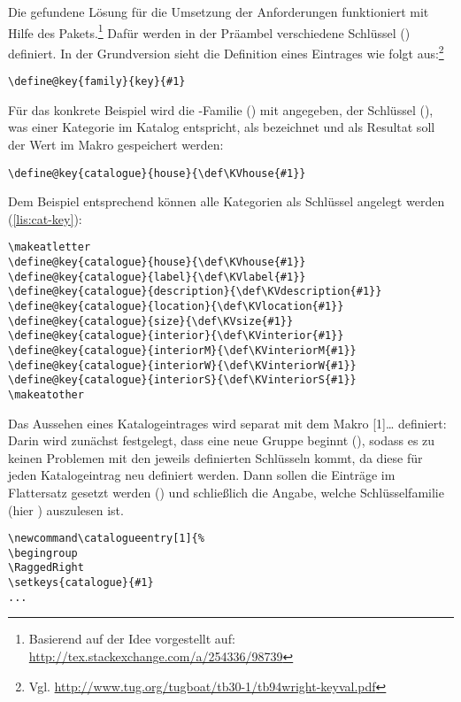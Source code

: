 \documentclass[ngerman]{dtk}
\makeatletter
\newcommand\catalogueentry[1]{%
\RaggedRight\begingroup
\setkeys{catalogue}{#1}%
\ifdef{\KVhouse}{\section{\KVhouse
			\ifdef{\KVlabel}{\label{\KVlabel}}{}}
			}{}%
\begin{labeling}{Beschreibung}
\ifdef{\KVdescription}{\item[Beschreibung] \KVdescription}{}%
\ifdef{\KVlocation}{\item[Verortung] \KVlocation}{}%
\ifdef{\KVinterior}{%
	\item[Ausstattung] \KVinterior %
	\ifboolexpr{bool{@KVinteriorM} or bool {@KVinteriorW} or bool {@KVinteriorS}}{%
	\begin{labeling}{Wandgemälde}
			\ifdef{\KVinteriorM}{\item[Mosaike:] \KVinteriorM}{}
			\ifdef{\KVinteriorW}{\item[Wandgemälde:] \KVinteriorW}{}
			\ifdef{\KVinteriorS}{\item[Statuen:] \KVinteriorS}{}
			\end{labeling}
		}{}}%
	{%
	\ifboolexpr{bool{@KVinteriorM} or bool {@KVinteriorW} or bool {@KVinteriorS}}{%
		\item[Ausstattung]%
	\begin{labeling}{Wandgemälde}	
				\ifdef{\KVinteriorM}{\item[Mosaike:] \KVinteriorM}{}
				\ifdef{\KVinteriorW}{\item[Wandgemälde:] \KVinteriorW}{}
				\ifdef{\KVinteriorS}{\item[Statuen:] \KVinteriorS}{}
			\end{labeling}
	}{}}%
\ifdef{\KVsize}{	\item[Größe] \SI{\KVsize}{\meter\squared}}{}%
\ifdef{\KVbackref}{\item[Erwähnungen]S.\ \KVbackref}{}%
\end{labeling}
\endgroup
}
\makeatother
\begin{document}
Die gefundene Lösung für die Umsetzung der Anforderungen funktioniert mit Hilfe des    Pakets.\footnote{Basierend auf der Idee vorgestellt auf: \url{http://tex.stackexchange.com/a/254336/98739}}
Dafür werden in der Präambel verschiedene Schlüssel () definiert.
In der Grundversion sieht die Definition eines Eintrages wie folgt aus:\footnote{Vgl. \url{http://www.tug.org/tugboat/tb30-1/tb94wright-keyval.pdf}}
\begin{lstlisting}[style=noNumber]
\define@key{family}{key}{#1}
\end{lstlisting}
Für das konkrete Beispiel wird die -Familie () mit  angegeben,
der Schlüssel (), was einer Kategorie im Katalog entspricht, 
als  bezeichnet und als Resultat soll der Wert im Makro  gespeichert werden:
\begin{lstlisting}[style=noNumber]
\define@key{catalogue}{house}{\def\KVhouse{#1}}
\end{lstlisting}
Dem Beispiel entsprechend können alle Kategorien als Schlüssel angelegt werden (\cref{lis:cat-key}):
\begin{lstlisting}[style=number,caption={Definition der Schlüssel},label={lis:cat-key}]
\makeatletter
\define@key{catalogue}{house}{\def\KVhouse{#1}}
\define@key{catalogue}{label}{\def\KVlabel{#1}}
\define@key{catalogue}{description}{\def\KVdescription{#1}}
\define@key{catalogue}{location}{\def\KVlocation{#1}}
\define@key{catalogue}{size}{\def\KVsize{#1}}
\define@key{catalogue}{interior}{\def\KVinterior{#1}}
\define@key{catalogue}{interiorM}{\def\KVinteriorM{#1}}
\define@key{catalogue}{interiorW}{\def\KVinteriorW{#1}}
\define@key{catalogue}{interiorS}{\def\KVinteriorS{#1}}
\makeatother
\end{lstlisting}
Das Aussehen eines Katalogeintrages wird separat mit dem Makro
 [1]{\ldots} 
definiert:
Darin wird zunächst festgelegt,
dass eine neue Gruppe beginnt (), sodass
es zu keinen Problemen mit den jeweils definierten Schlüsseln kommt, 
da diese für jeden Katalogeintrag neu definiert werden.
Dann sollen die  Einträge im Flattersatz gesetzt werden () und schließlich die Angabe,
 welche Schlüsselfamilie (hier ) auszulesen ist.
\begin{lstlisting}[style=number,caption={Definition der Katalogeinträge, Anfang},label={lis:cat-1}]
\newcommand\catalogueentry[1]{%
\begingroup
\RaggedRight
\setkeys{catalogue}{#1}
...
\end{lstlisting}
\end{document}
